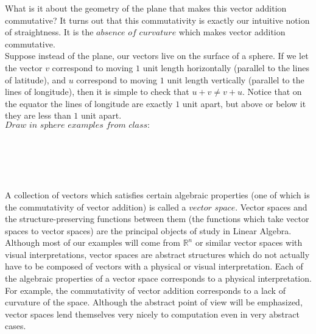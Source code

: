 \documentclass{article}
\theoremstyle{problemstyle}
\begin{document}
\begin{center}
\end{center}

What is it about the geometry of the plane that makes this vector addition commutative? It turns out that this commutativity is exactly our intuitive notion of straightness.  It is the $absence$ $of$ $curvature$ which makes vector addition commutative.\\

Suppose instead of the plane, our vectors live on the surface of a sphere. If we let the vector $v$ correspond to moving $1$ unit length horizontally (parallel to the lines of latitude), and $u$ correspond to moving $1$ unit length vertically (parallel to the lines of longitude), then it is simple to check that $u+v \neq v+u$. Notice that on the equator the lines of longitude are exactly $1$ unit apart, but above or below it they are less than $1$ unit apart.\\ 

$\textit{Draw in sphere examples from class:}$\\\\\\\\\\\\

A collection of vectors which satisfies certain algebraic properties (one of which is the commutativity of vector addition) is called a $vector$ $space$.  Vector spaces and the structure-preserving functions between them (the functions which take vector spaces to vector spaces) are the principal objects of study in Linear Algebra. Although most of our examples will come from $\mathbb{R}^n$ or similar vector spaces with visual interpretations, vector spaces are abstract structures which do not actually have to be composed of vectors with a physical or visual interpretation. Each of the algebraic properties of a vector space corresponds to a physical interpretation.  For example, the commutativity of vector addition corresponds to a lack of curvature of the space. Although the abstract point of view will be emphasized, vector spaces lend themselves very nicely to computation even in very abstract cases.
\end{document}

